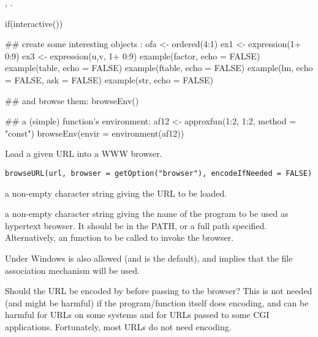 %
\begin{SeeAlso}\relax
{}, .
\end{SeeAlso}
%
\begin{Examples}
\begin{ExampleCode}
if(interactive()) {
   ## create some interesting objects :
   ofa <- ordered(4:1)
   ex1 <- expression(1+ 0:9)
   ex3 <- expression(u,v, 1+ 0:9)
   example(factor, echo = FALSE)
   example(table, echo = FALSE)
   example(ftable, echo = FALSE)
   example(lm, echo = FALSE, ask = FALSE)
   example(str, echo = FALSE)

   ## and browse them:
   browseEnv()

   ## a (simple) function's environment:
   af12 <- approxfun(1:2, 1:2, method = "const")
   browseEnv(envir = environment(af12))
 }
\end{ExampleCode}
\end{Examples}
%
\begin{Description}\relax
Load a given URL into a WWW browser.
\end{Description}
%
\begin{Usage}
\begin{verbatim}
browseURL(url, browser = getOption("browser"), encodeIfNeeded = FALSE)
\end{verbatim}
\end{Usage}
%
\begin{Arguments}
\begin{ldescription}
\item[\code{url}] a non-empty character string giving the URL to be loaded.
\item[\code{browser}] a non-empty character string giving the name of the
program to be used as hypertext browser.  It should be in the PATH,
or a full path specified.  Alternatively, an \R{} function to be
called to invoke the browser.

Under Windows  is also allowed (and is the default), and
implies that the file association mechanism will be used.

\item[\code{encodeIfNeeded}] Should the URL be encoded by
 before passing to the browser?  This is not
needed (and might be harmful) if the  program/function
itself does encoding, and can be harmful for  URLs on some
systems and for  URLs passed to some CGI applications.
Fortunately, most URLs do not need encoding.
\end{ldescription}
\end{Arguments}
